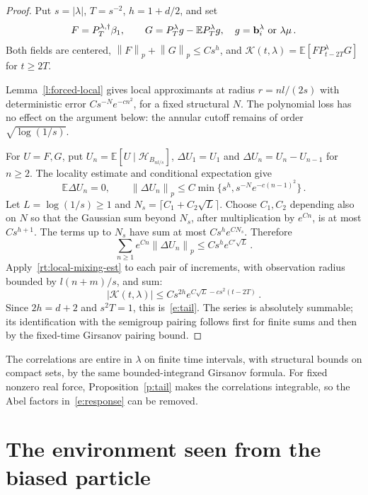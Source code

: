 \documentclass[11pt]{amsart}
\theoremstyle{definition}
\theoremstyle{remark}
\numberwithin{equation}{section}
\newcommand{\E}{\mathbb E}
\renewcommand{\b}{\mathbf b}
\newcommand{\norm}[1]{\left\|#1\right\|}
\begin{document}
\begin{proof}
Put $s=|\lambda|$, $T=s^{-2}$, $h=1+d/2$, and set
\begin{equation*}
 F=P_T^{\lambda,\dagger}\beta_1,\qquad
 G=P_T^\lambda g-\E P_T^\lambda g,
 \quad g=\b_i^\lambda\ \hbox{or}\ \lambda\mu\, .
\end{equation*}
Both fields are centered, $\norm F_p+\norm G_p\leq Cs^h$, and $\mathcal K(t,\lambda)=\E[F P_{t-2T}^\lambda G]$ for $t\geq2T$.

Lemma~\ref{l:forced-local} gives local approximants at radius $r=nl/(2s)$ with deterministic error $Cs^{-N}e^{-cn^2}$, for a fixed structural $N$. The polynomial loss has no effect on the argument below: the annular cutoff remains of order $\sqrt{\log(1/s)}$.

For $U=F,G$, put $U_n=\E[U\mid\mathcal H_{B_{nl/s}}]$, $\Delta U_1=U_1$ and $\Delta U_n=U_n-U_{n-1}$ for $n\geq2$. The locality estimate and conditional expectation give
\begin{equation*}
 \E\Delta U_n=0,\qquad
 \norm{\Delta U_n}_p\leq C\min\{s^h,s^{-N}e^{-c(n-1)^2}\}\, .
\end{equation*}
Let $L=\log(1/s)\geq1$ and $N_s=\lceil C_1+C_2\sqrt L\rceil$. Choose $C_1,C_2$ depending also on $N$ so that the Gaussian sum beyond $N_s$, after multiplication by $e^{Cn}$, is at most $Cs^{h+1}$. The terms up to $N_s$ have sum at most $Cs^he^{CN_s}$. Therefore
\begin{equation*}
 \sum_{n\geq1}e^{Cn}\norm{\Delta U_n}_p
 \leq Cs^he^{C'\sqrt L}\, .
\end{equation*}
Apply~\eqref{rt:local-mixing-est} to each pair of increments, with observation radius bounded by $l(n+m)/s$, and sum:
\begin{equation*}
 |\mathcal K(t,\lambda)|
 \leq Cs^{2h}e^{C\sqrt L-cs^2(t-2T)}\, .
\end{equation*}
Since $2h=d+2$ and $s^2T=1$, this is~\eqref{e:tail}. The series is absolutely summable; its identification with the semigroup pairing follows first for finite sums and then by the fixed-time Girsanov pairing bound.
\end{proof}

The correlations are entire in $\lambda$ on finite time intervals, with structural bounds on compact sets, by the same bounded-integrand Girsanov formula. For fixed nonzero real force, Proposition~\ref{p:tail} makes the correlations integrable, so the Abel factors in~\eqref{e:response} can be removed.


\section{The environment seen from the biased particle}\label{sec.entropy}\label{s:gauge}
\end{document}
